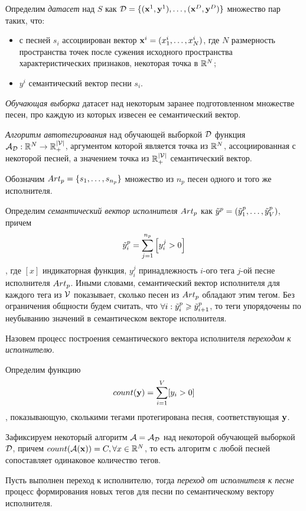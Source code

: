 Определим \emph{датасет} над $S$ как $\mathcal{D} = \{ (\mathbf{x}^1, \mathbf{y}^1), \ldots, (\mathbf{x}^D, \mathbf{y}^D) \}$ \ld множество пар таких, 
что:
\begin{itemize}
 \item с песней $s_i$ ассоциирован вектор $\mathbf{x}^i = (x^i_1, \ldots, x^i_N)$, где $N$ \ld размерность пространства точек после сужения 
 исходного пространства характеристических признаков, \ld некоторая точка в $\mathbb{R}^N$;
 \item $y^i$ \ld семантический вектор песни $s_i$.
\end{itemize}

\emph{Обучающая выборка} \ld датасет над некоторым заранее подготовленном множестве песен, про каждую из которых извесен ее семантический вектор.

\emph{Алгоритм автотегирования} над обучающей выборкой $\mathcal{D}$ \ld функция ${\mathcal{A}}_{\mathcal{D}} : \mathbb{R}^N \rightarrow \mathbb{R}^{|{\mathcal{V}}|}_{+}$,
аргументом которой является точка из $\mathbb{R}^N$, ассоциированная с некоторой песней, а значением \ld точка из $\mathbb{R}^{|{\mathcal{V}}|}_{+}$ \ld семантический вектор.

Обозначим ${Art}_p = \{s_1, \ldots, s_{n_p} \}$ множество из $n_p$ песен одного и того же исполнителя.

Определим \emph{семантический вектор исполнителя} ${Art}_p$ как $\tilde{y}^p = (\tilde{y}^p_1, \ldots, \tilde{y}^p_{V})$, причем 
$$\tilde{y}^p_i = \sum^{n_p}_{j=1} \left [y^j_i > 0 \right ]$$,
где $[x]$ \ld индикаторная функция, $y^j_i$ \ld принадлежность $i$-ого тега $j$-ой песне исполнителя ${Art}_p$. Иными словами, семантический вектор исполнителя
для каждого тега из $\mathcal{V}$ показывает, сколько песен из ${Art}_p$ обладают этим тегом.
Без ограничения общности будем считать, что $\forall i: \tilde{y}^p_i \geqslant \tilde{y}^p_{i+1}$, то теги упорядочены по неубыванию значений в семантическом векторе исполнителя.

Назовем процесс построения семантического вектора исполнителя \emph{переходом к исполнителю}.

Определим функцию $$count(\mathbf{y}) = \sum^{V}_{i=1} [y_i > 0]$$,
показывающую, сколькими тегами протегирована песня, соответствующая $\mathbf{y}$.

Зафиксируем некоторый алгоритм $\mathcal{A} = \mathcal{A}_{\mathcal{D}}$ над некоторой обучающей выборкой $\mathcal{D}$, причем $count(\mathcal{A}(\mathbf{x})) = C, \forall x \in \mathbb{R}^N$,
то есть алгоритм с любой песней сопоставляет одинаковое количество тегов.

Пусть выполнен переход к исполнителю, тогда \emph{переход от исполнителя к песне} \ld процесс формирования новых тегов для песни по семантическому вектору исполнителя.

